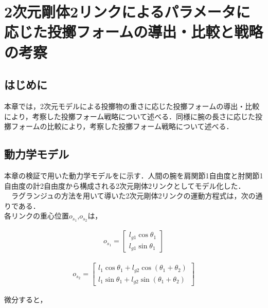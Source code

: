 \chapter[2次元剛体2リンクによるパラメータに応じた投擲フォームの導出・比較と戦略の考察]{2次元剛体2リンクによるパラメータに応じた投擲フォームの導出・比較と戦略の考察}

\section{はじめに}
本章では，2次元モデルによる投擲物の重さに応じた投擲フォームの導出・比較により，考察した投擲フォーム戦略について述べる．同様に腕の長さに応じた投擲フォームの比較により，考察した投擲フォーム戦略について述べる．
\section{動力学モデル}
本章の検証で用いた動力学モデルをに示す．人間の腕を肩関節1自由度と肘関節1自由度の計2自由度から構成される2次元剛体2リンクとしてモデル化した．\\
　ラグランジュの方法を用いて導いた2次元剛体2リンクの運動方程式は，次の通りである．\\
各リンクの重心位置$o_{s_{1}}$,$o_{s_{2}}$は，


\begin{eqnarray}
  o_{s_{1}} = 
              \begin{bmatrix}
              l_{g1}\cos\theta_{1}\\
              l_{g1}\sin\theta_{1}
              \end{bmatrix}
\end{eqnarray}

\begin{eqnarray}
  o_{s_{2}} = 
              \begin{bmatrix}
              l_{1}\cos\theta_{1} + l_{g2}\cos(\theta_{1} + \theta_{2})\\
              l_{1}\sin\theta_{1} + l_{g2}\sin(\theta_{1} + \theta_{2})
              \end{bmatrix}
\end{eqnarray}

微分すると，

